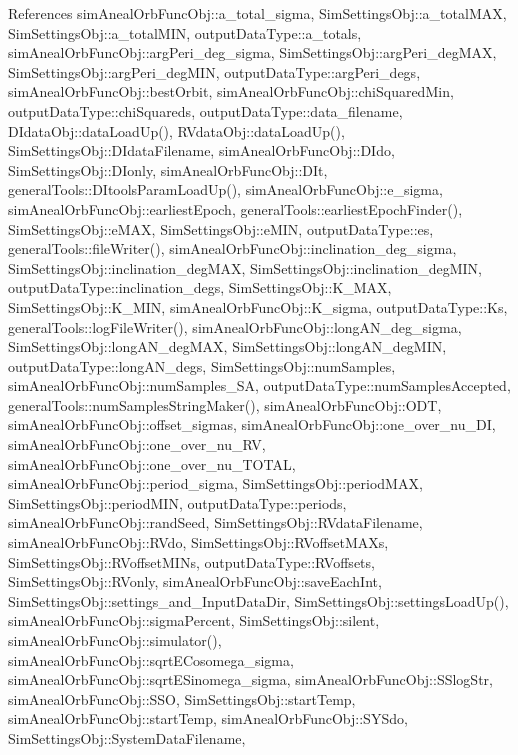 References sim\-Aneal\-Orb\-Func\-Obj\-::a\-\_\-total\-\_\-sigma, Sim\-Settings\-Obj\-::a\-\_\-total\-M\-A\-X, Sim\-Settings\-Obj\-::a\-\_\-total\-M\-I\-N, output\-Data\-Type\-::a\-\_\-totals, sim\-Aneal\-Orb\-Func\-Obj\-::arg\-Peri\-\_\-deg\-\_\-sigma, Sim\-Settings\-Obj\-::arg\-Peri\-\_\-deg\-M\-A\-X, Sim\-Settings\-Obj\-::arg\-Peri\-\_\-deg\-M\-I\-N, output\-Data\-Type\-::arg\-Peri\-\_\-degs, sim\-Aneal\-Orb\-Func\-Obj\-::best\-Orbit, sim\-Aneal\-Orb\-Func\-Obj\-::chi\-Squared\-Min, output\-Data\-Type\-::chi\-Squareds, output\-Data\-Type\-::data\-\_\-filename, D\-Idata\-Obj\-::data\-Load\-Up(), R\-Vdata\-Obj\-::data\-Load\-Up(), Sim\-Settings\-Obj\-::\-D\-Idata\-Filename, sim\-Aneal\-Orb\-Func\-Obj\-::\-D\-Ido, Sim\-Settings\-Obj\-::\-D\-Ionly, sim\-Aneal\-Orb\-Func\-Obj\-::\-D\-It, general\-Tools\-::\-D\-Itools\-Param\-Load\-Up(), sim\-Aneal\-Orb\-Func\-Obj\-::e\-\_\-sigma, sim\-Aneal\-Orb\-Func\-Obj\-::earliest\-Epoch, general\-Tools\-::earliest\-Epoch\-Finder(), Sim\-Settings\-Obj\-::e\-M\-A\-X, Sim\-Settings\-Obj\-::e\-M\-I\-N, output\-Data\-Type\-::es, general\-Tools\-::file\-Writer(), sim\-Aneal\-Orb\-Func\-Obj\-::inclination\-\_\-deg\-\_\-sigma, Sim\-Settings\-Obj\-::inclination\-\_\-deg\-M\-A\-X, Sim\-Settings\-Obj\-::inclination\-\_\-deg\-M\-I\-N, output\-Data\-Type\-::inclination\-\_\-degs, Sim\-Settings\-Obj\-::\-K\-\_\-\-M\-A\-X, Sim\-Settings\-Obj\-::\-K\-\_\-\-M\-I\-N, sim\-Aneal\-Orb\-Func\-Obj\-::\-K\-\_\-sigma, output\-Data\-Type\-::\-Ks, general\-Tools\-::log\-File\-Writer(), sim\-Aneal\-Orb\-Func\-Obj\-::long\-A\-N\-\_\-deg\-\_\-sigma, Sim\-Settings\-Obj\-::long\-A\-N\-\_\-deg\-M\-A\-X, Sim\-Settings\-Obj\-::long\-A\-N\-\_\-deg\-M\-I\-N, output\-Data\-Type\-::long\-A\-N\-\_\-degs, Sim\-Settings\-Obj\-::num\-Samples, sim\-Aneal\-Orb\-Func\-Obj\-::num\-Samples\-\_\-\-S\-A, output\-Data\-Type\-::num\-Samples\-Accepted, general\-Tools\-::num\-Samples\-String\-Maker(), sim\-Aneal\-Orb\-Func\-Obj\-::\-O\-D\-T, sim\-Aneal\-Orb\-Func\-Obj\-::offset\-\_\-sigmas, sim\-Aneal\-Orb\-Func\-Obj\-::one\-\_\-over\-\_\-nu\-\_\-\-D\-I, sim\-Aneal\-Orb\-Func\-Obj\-::one\-\_\-over\-\_\-nu\-\_\-\-R\-V, sim\-Aneal\-Orb\-Func\-Obj\-::one\-\_\-over\-\_\-nu\-\_\-\-T\-O\-T\-A\-L, sim\-Aneal\-Orb\-Func\-Obj\-::period\-\_\-sigma, Sim\-Settings\-Obj\-::period\-M\-A\-X, Sim\-Settings\-Obj\-::period\-M\-I\-N, output\-Data\-Type\-::periods, sim\-Aneal\-Orb\-Func\-Obj\-::rand\-Seed, Sim\-Settings\-Obj\-::\-R\-Vdata\-Filename, sim\-Aneal\-Orb\-Func\-Obj\-::\-R\-Vdo, Sim\-Settings\-Obj\-::\-R\-Voffset\-M\-A\-Xs, Sim\-Settings\-Obj\-::\-R\-Voffset\-M\-I\-Ns, output\-Data\-Type\-::\-R\-Voffsets, Sim\-Settings\-Obj\-::\-R\-Vonly, sim\-Aneal\-Orb\-Func\-Obj\-::save\-Each\-Int, Sim\-Settings\-Obj\-::settings\-\_\-and\-\_\-\-Input\-Data\-Dir, Sim\-Settings\-Obj\-::settings\-Load\-Up(), sim\-Aneal\-Orb\-Func\-Obj\-::sigma\-Percent, Sim\-Settings\-Obj\-::silent, sim\-Aneal\-Orb\-Func\-Obj\-::simulator(), sim\-Aneal\-Orb\-Func\-Obj\-::sqrt\-E\-Cosomega\-\_\-sigma, sim\-Aneal\-Orb\-Func\-Obj\-::sqrt\-E\-Sinomega\-\_\-sigma, sim\-Aneal\-Orb\-Func\-Obj\-::\-S\-Slog\-Str, sim\-Aneal\-Orb\-Func\-Obj\-::\-S\-S\-O, Sim\-Settings\-Obj\-::start\-Temp, sim\-Aneal\-Orb\-Func\-Obj\-::start\-Temp, sim\-Aneal\-Orb\-Func\-Obj\-::\-S\-Y\-Sdo, Sim\-Settings\-Obj\-::\-System\-Data\-Filename, 